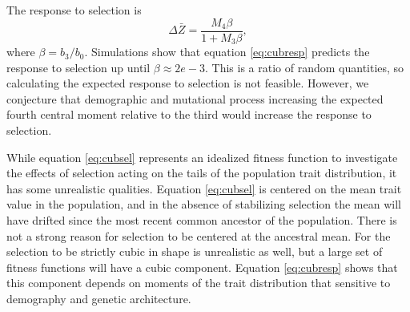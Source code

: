 The response to selection is
\begin{equation}
  \label{eq:cubresp}
  \Delta \bar{Z} = \frac{M_4\beta}{1 + M_3\beta},
\end{equation}
where $\beta=b_3/b_0$. Simulations show that equation \eqref{eq:cubresp}
predicts the response to selection up until $\beta\approx 2e-3$. This is a ratio
of random quantities, so calculating the expected response to selection is not
feasible. However, we conjecture that demographic and mutational process
increasing the expected fourth central moment relative to the third would
increase the response to selection.

While equation \eqref{eq:cubsel} represents an idealized fitness function to
investigate the effects of selection acting on the tails of the population trait
distribution, it has some unrealistic qualities. Equation \eqref{eq:cubsel} is
centered on the mean trait value in the population, and in the absence of
stabilizing selection the mean will have drifted since the most recent common
ancestor of the population. There is not a strong reason for selection to be
centered at the ancestral mean. For the selection to be strictly cubic in shape
is unrealistic as well, but a large set of fitness functions will have a cubic
component. Equation \eqref{eq:cubresp} shows that this component depends on
moments of the trait distribution that sensitive to demography and genetic
architecture.
